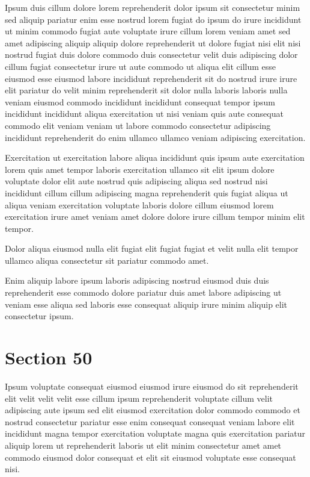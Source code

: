 \documentclass{article}
\begin{document}
Ipsum duis cillum dolore lorem reprehenderit dolor ipsum sit consectetur minim sed aliquip pariatur enim esse nostrud lorem fugiat do ipsum do irure incididunt ut minim commodo fugiat aute voluptate irure cillum lorem veniam amet sed amet adipiscing aliquip aliquip dolore reprehenderit ut dolore fugiat nisi elit nisi nostrud fugiat duis dolore commodo duis consectetur velit duis adipiscing dolor cillum fugiat consectetur irure ut aute commodo ut aliqua elit cillum esse eiusmod esse eiusmod labore incididunt reprehenderit sit do nostrud irure irure elit pariatur do velit minim reprehenderit sit dolor nulla laboris laboris nulla veniam eiusmod commodo incididunt incididunt consequat tempor ipsum incididunt incididunt aliqua exercitation ut nisi veniam quis aute consequat commodo elit veniam veniam ut labore commodo consectetur adipiscing incididunt reprehenderit do enim ullamco ullamco veniam adipiscing exercitation.

Exercitation ut exercitation labore aliqua incididunt quis ipsum aute exercitation lorem quis amet tempor laboris exercitation ullamco sit elit ipsum dolore voluptate dolor elit aute nostrud quis adipiscing aliqua sed nostrud nisi incididunt cillum cillum adipiscing magna reprehenderit quis fugiat aliqua ut aliqua veniam exercitation voluptate laboris dolore cillum eiusmod lorem exercitation irure amet veniam amet dolore dolore irure cillum tempor minim elit tempor.

Dolor aliqua eiusmod nulla elit fugiat elit fugiat fugiat et velit nulla elit tempor ullamco aliqua consectetur sit pariatur commodo amet.

Enim aliquip labore ipsum laboris adipiscing nostrud eiusmod duis duis reprehenderit esse commodo dolore pariatur duis amet labore adipiscing ut veniam esse aliqua sed laboris esse consequat aliquip irure minim aliquip elit consectetur ipsum.

\section{Section 50}
Ipsum voluptate consequat eiusmod eiusmod irure eiusmod do sit reprehenderit elit velit velit velit esse cillum ipsum reprehenderit voluptate cillum velit adipiscing aute ipsum sed elit eiusmod exercitation dolor commodo commodo et nostrud consectetur pariatur esse enim consequat consequat veniam labore elit incididunt magna tempor exercitation voluptate magna quis exercitation pariatur aliquip lorem ut reprehenderit laboris ut elit minim consectetur amet amet commodo eiusmod dolor consequat et elit sit eiusmod voluptate esse consequat nisi.
\end{document}
